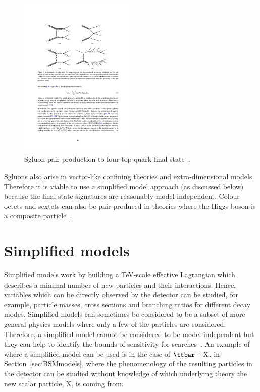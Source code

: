 \begin{figure}[ht!]
\begin{center}
    \includegraphics[width=0.49\textwidth]{images/Theory/sgluontotttt.pdf}
    \caption{Sgluon pair production to four-top-quark final state~\cite{Aad:2015kqa}.}
    \label{fig:sgluontttt}
\end{center}
\end{figure}

Sgluons also arise in vector-like confining theories and extra-dimensional models. Therefore it is viable to use a simplified model approach (as discussed below) because the final state signatures are reasonably model-independent. Colour octets and sextets can also be pair produced in theories where the Higgs boson is a composite particle~\cite{Cacciapaglia2015}.



\section{Simplified models}

Simplified models work by building a TeV-scale effective Lagrangian which describes a minimal number of new particles and their interactions. Hence, variables which can be directly observed by the detector can be studied, for example, particle masses, cross sections and branching ratios for different decay modes. Simplified models can sometimes be considered to be a subset of more general physics models where only a few of the particles are considered. Therefore, a simplified model cannot be considered to be model independent but they can help to identify the bounds of sensitivity for searches~\cite{0954-3899-39-10-105005}. An example of where a simplified model can be used is in the case of $\ttbar+\textrm{X}$, in Section~\ref{sec:BSMmodels}, where the phenomenology of the resulting particles in the detector can be studied without knowledge of which underlying theory the new scalar particle, X, is coming from.


